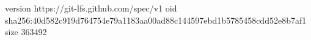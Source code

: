 version https://git-lfs.github.com/spec/v1
oid sha256:40d582c919d764754e79a1183aa00ad88c144597ebd1b5785458cdd52e8b7af1
size 363492
